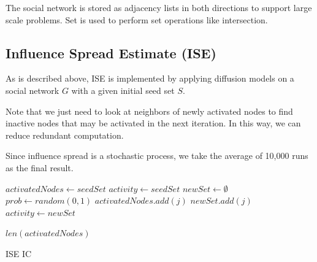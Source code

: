 \documentclass[conference]{IEEEtran}
\begin{document}
    The social network is stored as adjacency lists in both directions to support large scale problems. Set is used to perform set operations like intersection.

    \subsection{Influence Spread Estimate (ISE)}

    As is described above, ISE is implemented by applying diffusion models on a social network $G$ with a given initial seed set $S$. 

    Note that we just need to look at neighbors of newly activated nodes to find inactive nodes that may be activated in the next iteration. In this way, we can reduce redundant computation.

    Since influence spread is a stochastic process, we take the average of 10,000 runs as the final result.

    \begin{algorithm}[H]
        \begin{algorithmic}[1]
            \State $activatedNodes \gets seedSet$
            \State $activity \gets seedSet$
                \State $newSet \gets \emptyset$
                            \State $prob \gets random(0,1)$
                                \State $activatedNodes.add(j)$
                                \State $newSet.add(j)$
                            \EndIf
                        \EndIf
                    \EndFor
                \EndFor
                \State $activity \gets newSet$
            \EndWhile


            \Return $len(activatedNodes)$
            \EndFunction
        \end{algorithmic}
        \caption{ISE IC}
    \end{algorithm}
\end{document}
